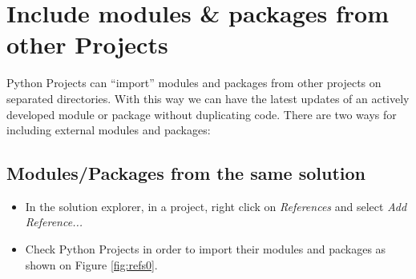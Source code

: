 %
%
%
%
%
%

    \section{Include modules \& packages from other Projects}

Python Projects can ``import'' modules and packages from other projects on separated directories. With this way we can have the latest updates of an actively developed module or package without duplicating code. There are two ways for including external modules and packages:

\subsection*{Modules/Packages from the same solution}

\begin{itemize}
	\item In the solution explorer, in a project, right click on \textit{References} and select \textit{Add Reference...}
	\item Check Python Projects in order to import their modules and packages as shown on Figure \ref{fig:refs0}.
\end{itemize}

